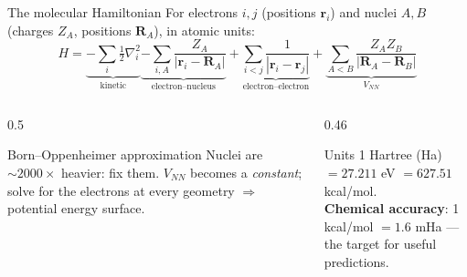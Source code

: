 \documentclass[aspectratio=169,11pt]{beamer}
\newcommand{\key}[1]{{\color{qdark}\textbf{#1}}}
\begin{document}
\begin{frame}{The molecular Hamiltonian}
  For electrons $i, j$ (positions $\mathbf r_i$) and nuclei $A, B$ (charges $Z_A$, positions $\mathbf R_A$), in atomic units:
  \[ H = \underbrace{-\sum_i\tfrac12\nabla_i^2}_{\text{kinetic}} \underbrace{- \sum_{i,A}\frac{Z_A}{|\mathbf r_i - \mathbf R_A|}}_{\text{electron--nucleus}}
       + \underbrace{\sum_{i<j}\frac{1}{|\mathbf r_i - \mathbf r_j|}}_{\text{electron--electron}} + \underbrace{\sum_{A<B}\frac{Z_AZ_B}{|\mathbf R_A - \mathbf R_B|}}_{V_{NN}} \]
  \begin{columns}[T]
    \begin{column}{0.5\textwidth}
      \begin{block}{Born--Oppenheimer approximation}
        Nuclei are $\sim 2000\times$ heavier: fix them. $V_{NN}$ becomes a \emph{constant}; solve for the electrons at every geometry
        $\Rightarrow$ potential energy surface.
      \end{block}
    \end{column}
    \begin{column}{0.46\textwidth}
      \begin{block}{Units}
        1 Hartree (Ha) $= 27.211$ eV $= 627.51$ kcal/mol.\\
        \key{Chemical accuracy}: 1 kcal/mol $= 1.6$ mHa --- the target for useful predictions.
      \end{block}
    \end{column}
  \end{columns}
\end{frame}
\end{document}
